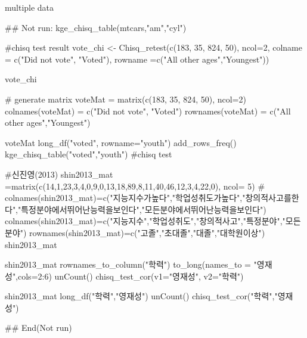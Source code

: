 \documentclass[a4paper]{book}
\begin{document}
%
\begin{Value}
multiple data
\end{Value}
%
\begin{Examples}
\begin{ExampleCode}

\#\# Not run: 
kge_chisq_table(mtcars,"am","cyl")


#chisq test result
vote_chi <- Chisq_retest(c(183, 35, 824, 50), ncol=2,
                        colname = c("Did not vote", "Voted"),
                         rowname =c("All other ages","Youngest"))

vote_chi


# generate matrix
voteMat = matrix(c(183, 35, 824, 50), ncol=2)
colnames(voteMat) = c("Did not vote", "Voted")
rownames(voteMat) = c("All other ages","Youngest")

voteMat%
  long_df("voted", rowname="youth")%
  add_rows_freq() %
  kge_chisq_table("voted","youth")    #chisq test


#신진영(2013)
shin2013_mat =matrix(c(14,1,23,3,4,0,9,0,13,18,89,8,11,40,46,12,3,4,22,0), ncol= 5)
# colnames(shin2013_mat)=c("지능지수가높다","학업성취도가높다","창의적사고를한다","특정분야에서뛰어난능력을보인다","모든분야에서뛰어난능력을보인다")
colnames(shin2013_mat)=c("지능지수","학업성취도","창의적사고","특정분야","모든분야")
rownames(shin2013_mat)=c("고졸","초대졸","대졸","대학원이상")
shin2013_mat

shin2013_mat %
  rownames_to_column("학력") %
  to_long(names_to = "영재성",cols=2:6) %
  unCount() %
  chisq_test_cor(v1="영재성", v2="학력")


shin2013_mat%
  long_df("학력","영재성") %
  unCount() %
  chisq_test_cor("학력","영재성")


## End(Not run)
\end{ExampleCode}
\end{Examples}
\end{document}
